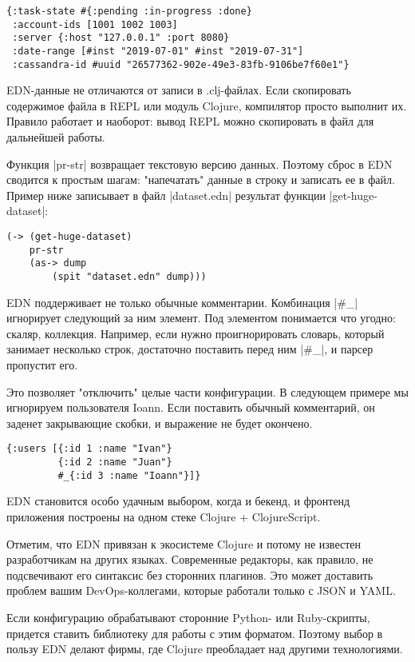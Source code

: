 \begin{verbatim}
{:task-state #{:pending :in-progress :done}
 :account-ids [1001 1002 1003]
 :server {:host "127.0.0.1" :port 8080}
 :date-range [#inst "2019-07-01" #inst "2019-07-31"]
 :cassandra-id #uuid "26577362-902e-49e3-83fb-9106be7f60e1"}
\end{verbatim}

EDN-данные не отличаются от записи в .clj-файлах. Если скопировать содержимое
файла в REPL или модуль Clojure, компилятор просто выполнит их. Правило работает
и наоборот: вывод REPL можно скопировать в файл для дальнейшей работы.

Функция \spverb|pr-str| возвращает текстовую версию данных. Поэтому сброс в EDN
сводится к простым шагам: "напечатать" данные в строку и записать ее в
файл. Пример ниже записывает в файл \spverb|dataset.edn| результат функции
\spverb|get-huge-dataset|:

\begin{verbatim}
(-> (get-huge-dataset)
    pr-str
    (as-> dump
        (spit "dataset.edn" dump)))
\end{verbatim}

EDN поддерживает не только обычные комментарии. Комбинация \spverb|#_| игнорирует
следующий за ним элемент. Под элементом понимается что угодно: скаляр,
коллекция. Например, если нужно проигнорировать словарь, который занимает
несколько строк, достаточно поставить перед ним \spverb|#_|, и парсер пропустит
его.

Это позволяет "отключить" целые части конфигурации. В следующем примере мы
игнорируем пользователя Ioann. Если поставить обычный комментарий, он заденет
закрывающие скобки, и выражение не будет окончено.

\begin{verbatim}
{:users [{:id 1 :name "Ivan"}
         {:id 2 :name "Juan"}
         #_{:id 3 :name "Ioann"}]}
\end{verbatim}

EDN становится особо удачным выбором, когда и бекенд, и фронтенд приложения
построены на одном стеке Clojure + ClojureScript.

Отметим, что EDN привязан к экосистеме Clojure и потому не известен
разработчикам на других языках. Современные редакторы, как правило, не
подсвечивают его синтаксис без сторонних плагинов. Это может доставить проблем
вашим DevOps-коллегами, которые работали только с JSON и YAML.

Если конфигурацию обрабатывают сторонние Python- или Ruby-скрипты, придется
ставить библиотеку для работы с этим форматом. Поэтому выбор в пользу EDN делают
фирмы, где Clojure преобладает над другими технологиями.


